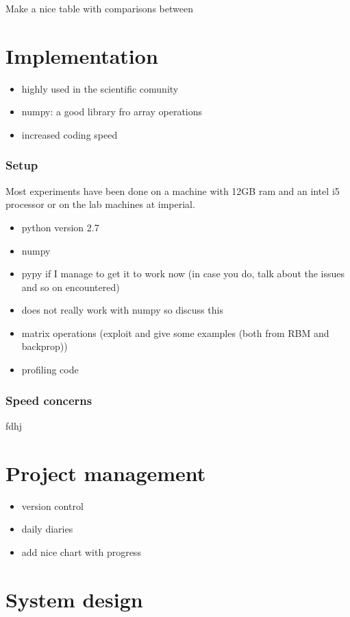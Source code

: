 \documentclass[11pt, fleqn, twoside]{article}
\begin{document}
  Make a nice table with comparisons between

\section{Implementation}

\begin{itemize}
  \item highly used in the scientific comunity
  \item numpy: a good library fro array operations
  \item increased coding speed
\end{itemize}

\subsubsection{Setup}

  Most experiments have been done on a machine with 12GB ram and an intel i5 processor or on the lab machines at imperial.

\begin{itemize}
  \item python version 2.7
  \item numpy
  \item pypy if I manage to get it to work now (in case you do, talk about the issues and so on encountered)
  \item does not really work with numpy so discuss this
  \item matrix operations (exploit and give some examples (both from RBM and backprop))
  \item profiling code
\end{itemize}

\subsubsection{Speed concerns}
fdhj

\section{ Project management}
\begin{itemize}
  \item version control
  \item daily diaries
  \item add nice chart with progress
\end{itemize}

\section{System design}
\end{document}
